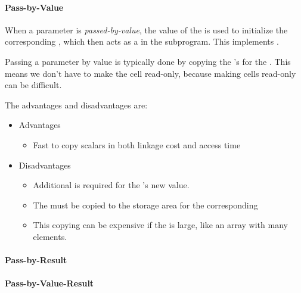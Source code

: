 \paragraph{Pass-by-Value}\label{par:Parameter_Passing-Pass_By_Value}
\begin{definition}\label{def:Pass_By_Value}
  When a parameter is \emph{passed-by-value}, the value of the  is used to initialize the corresponding , which then acts as a  in the subprogram.
  This implements  .

  Passing a parameter by value is typically done by copying the 's  for the .
  This means we don't have to make the  cell read-only, because making cells read-only can be difficult.

  The advantages and disadvantages are:
  \begin{itemize}[noitemsep]
  \item Advantages
    \begin{itemize}[noitemsep]
    \item Fast to copy scalars in both linkage cost and access time
    \end{itemize}
  \item Disadvantages
    \begin{itemize}[noitemsep]
    \item Additional  is required for the 's new value.
    \item The  must be copied to the storage area for the corresponding 
    \item This copying can be expensive if the  is large, like an array with many elements.
    \end{itemize}
  \end{itemize}
\end{definition}

\paragraph{Pass-by-Result}\label{par:Parameter_Passing-Pass_By_Result}
\paragraph{Pass-by-Value-Result}\label{par:Parameter_Passing-Pass_By_Value_Result}
